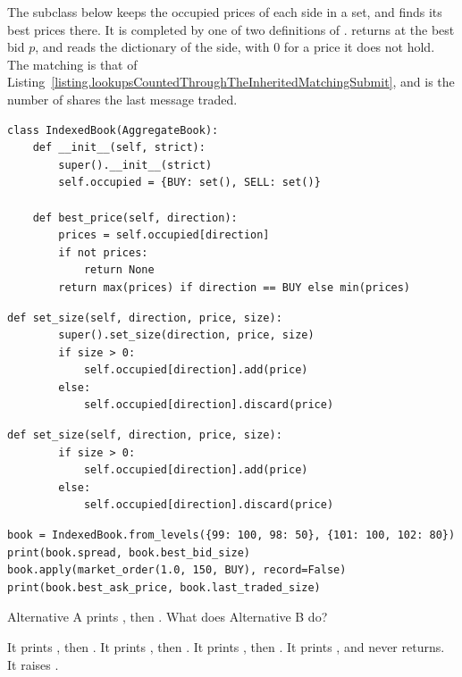 \begin{question}
\label{question.indexedBookWithoutSuper}
The subclass below keeps the occupied prices of each side in a set, and finds its best prices there.
It is completed by one of two definitions of .
 returns  at the best bid $p$,
and  reads the dictionary of the side, with 0 for a price it does not hold.
The matching is that of Listing~\ref{listing.lookupsCountedThroughTheInheritedMatchingSubmit},
and  is the number of shares the last message traded.
\begin{lstlisting}[caption={A book that indexes its prices in a set}, label=listing.indexedBookWithoutSuperClass]
class IndexedBook(AggregateBook):
    def __init__(self, strict):
        super().__init__(strict)
        self.occupied = {BUY: set(), SELL: set()}

    def best_price(self, direction):
        prices = self.occupied[direction]
        if not prices:
            return None
        return max(prices) if direction == BUY else min(prices)
\end{lstlisting}
\begin{lstlisting}[caption={Alternative A}, label=listing.indexedBookWithoutSuperA]
    def set_size(self, direction, price, size):
        super().set_size(direction, price, size)
        if size > 0:
            self.occupied[direction].add(price)
        else:
            self.occupied[direction].discard(price)
\end{lstlisting}
\begin{lstlisting}[caption={Alternative B}, label=listing.indexedBookWithoutSuperB]
    def set_size(self, direction, price, size):
        if size > 0:
            self.occupied[direction].add(price)
        else:
            self.occupied[direction].discard(price)
\end{lstlisting}
\begin{lstlisting}[caption={Run once with each alternative}, label=listing.indexedBookWithoutSuperRun]
book = IndexedBook.from_levels({99: 100, 98: 50}, {101: 100, 102: 80})
print(book.spread, book.best_bid_size)
book.apply(market_order(1.0, 150, BUY), record=False)
print(book.best_ask_price, book.last_traded_size)
\end{lstlisting}
Alternative A prints , then .
What does Alternative B do?
\begin{choices}
 \choice It prints , then .
 \choice It prints , then .
 \correctchoice It prints , then .
 \choice It prints , and  never returns.
 \choice It raises .
\end{choices}
\end{question}

